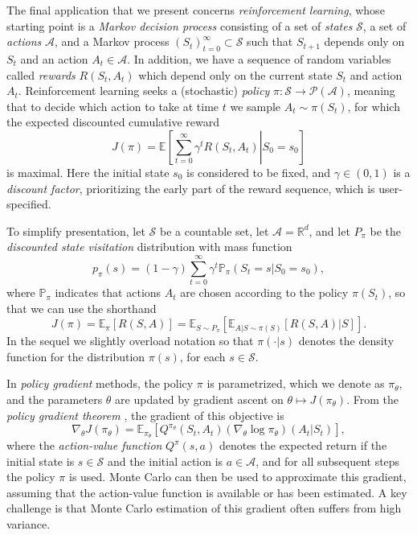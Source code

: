 \documentclass[12pt,paper=letter]{scrreprt}
\begin{document}
The final application that we present concerns \emph{reinforcement learning}, whose starting point is a \emph{Markov decision process} consisting of a set of \emph{states} $\mathcal{S}$, a set of \emph{actions} $\mathcal{A}$, and a Markov process $(S_t)_{t =0}^\infty \subset \mathcal{S}$ such that $S_{t+1}$ depends only on $S_t$ and an action $A_t \in \mathcal{A}$.
In addition, we have a sequence of random variables called \emph{rewards} $R(S_t,A_t)$ which depend only on the current state $S_t$ and action $A_t$.
Reinforcement learning seeks a (stochastic) \emph{policy} $\pi : \mathcal{S} \rightarrow \mathcal{P}(\mathcal{A})$, meaning that to decide which action to take at time $t$ we sample $A_t \sim \pi(S_t)$, for which the expected discounted cumulative reward
$$
J(\pi) = \mathbb{E}\left[ \left. \sum_{t=0}^\infty \gamma^t R(S_t,A_t) \right| S_0 = s_0 \right]
$$
is maximal.
Here the initial state $s_0$ is considered to be fixed, and $\gamma \in (0,1)$ is a \emph{discount factor}, prioritizing the early part of the reward sequence, which is user-specified.

To simplify presentation, let $\mathcal{S}$ be a countable set, let $\mathcal{A} = \mathbb{R}^d$, and let $P_\pi$ be the \emph{discounted state visitation} distribution with mass function
$$
p_\pi(s) = (1 - \gamma) \sum_{t=0}^\infty \gamma^t \mathbb{P}_\pi(S_t = s | S_0 = s_0) ,
$$
where $\mathbb{P}_\pi$ indicates that actions $A_t$ are chosen according to the policy $\pi(S_t)$, so that we can use the shorthand
$$
J(\pi) = \mathbb{E}_\pi[R(S,A)] = \mathbb{E}_{S \sim P_\pi} [ \mathbb{E}_{A|S \sim \pi(S)}[ R(S,A) | S ] ] .
$$
In the sequel we slightly overload notation so that $\pi(\cdot | s)$ denotes the density function for the distribution $\pi(s)$, for each $s \in \mathcal{S}$.

In \emph{policy gradient} methods, the policy $\pi$ is parametrized, which we denote as $\pi_\theta$, and the parameters $\theta$ are updated by gradient ascent on $\theta \mapsto J(\pi_\theta)$.
From the \emph{policy gradient theorem} \citep{williams1992simple}, the gradient of this objective is
$$
\nabla_\theta J(\pi_\theta) = \mathbb{E}_{\pi_\theta} \left[ Q^{\pi_\theta}(S_t, A_t) (\nabla_\theta \log \pi_\theta)(A_t|S_t)  \right],
$$
where the \emph{action-value function} $Q^\pi(s, a)$ denotes the expected return if the initial state is $s \in \mathcal{S}$ and the initial action is $a \in \mathcal{A}$, and for all subsequent steps the policy $\pi$ is used.
Monte Carlo can then be used to approximate this gradient, assuming that the action-value function is available or has been estimated.
A key challenge is that Monte Carlo estimation of this gradient often suffers from high variance.
\end{document}
